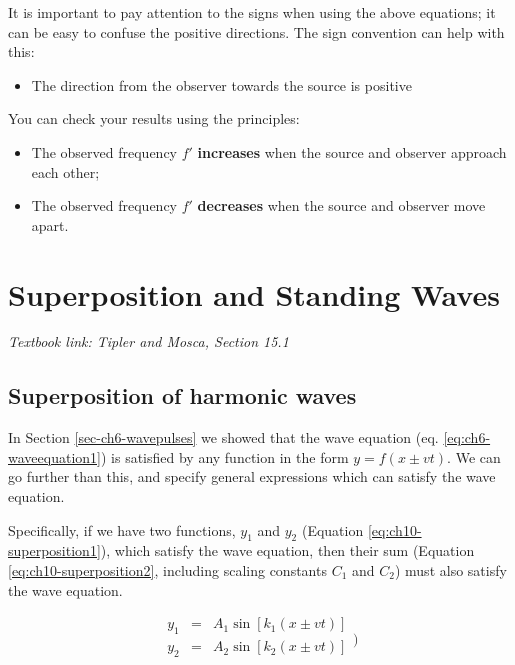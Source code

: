 \documentclass[
]{book}
\providecommand{\tightlist}{%
  \setlength{\itemsep}{0pt}\setlength{\parskip}{0pt}}
\begin{document}
It is important to pay attention to the signs when using the above equations; it can be easy to confuse the positive directions. The sign convention can help with this:

\begin{itemize}
\tightlist
\item
  The direction from the observer towards the source is positive
\end{itemize}

You can check your results using the principles:

\begin{itemize}
\tightlist
\item
  The observed frequency \(f'\) \textbf{increases} when the source and observer approach each other;
\item
  The observed frequency \(f'\) \textbf{decreases} when the source and observer move apart.
\end{itemize}

\hypertarget{sec-ch10-superposition}{%
\chapter{Superposition and Standing Waves}\label{sec-ch10-superposition}}

\emph{Textbook link: Tipler and Mosca, Section 15.1}

\hypertarget{sec-ch10-superposharmonic1}{%
\section{Superposition of harmonic waves}\label{sec-ch10-superposharmonic1}}

In Section \ref{sec-ch6-wavepulses} we showed that the wave equation (eq. \eqref{eq:ch6-waveequation1}) is satisfied by any function in the form \(y = f(x \pm vt)\). We can go further than this, and specify general expressions which can satisfy the wave equation.

Specifically, if we have two functions, \(y_1\) and \(y_2\) (Equation \eqref{eq:ch10-superposition1}), which satisfy the wave equation, then their sum (Equation \eqref{eq:ch10-superposition2}, including scaling constants \(C_1\) and \(C_2\)) must also satisfy the wave equation.

\begin{equation}
\begin{array}{rcl}
y_1 &=& A_1 \sin\left[k_1(x \pm vt)\right] \\
y_2 &=& A_2 \sin\left[k_2(x \pm vt)\right] \\
\end{array}
\label{eq:ch10-superposition1})
\end{equation}
\end{document}

